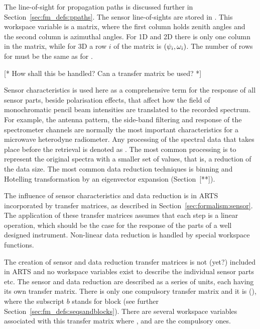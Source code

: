 The line-of-sight for propagation paths is discussed further in
Section~\ref{sec:fm_defs:ppaths}. The sensor line-of-sights are stored in
. This workspace variable is a matrix, where the
first column holds zenith angles and the second column is azimuthal
angles. For 1D and 2D there is only one column in the matrix, while
for 3D a row $i$ of the matrix is $(\psi_{i},\omega_{i})$. The
number of rows for  must be the same as for
.


\label{sec:fm_defs:sensorpol}

[* How shall this be handled? Can a transfer matrix be used?
 *]


\label{sec:fm_defs:sensorchar}

Sensor characteristics is used here as a
comprehensive term for the response of all sensor parts, beside
polarisation effects, that affect how the field of monochromatic
pencil beam intensities are translated to the recorded spectrum. For
example, the antenna pattern, the side-band filtering and response of
the spectrometer channels are normally the most important
characteristics for a microwave heterodyne radiometer. Any processing
of the spectral data that takes place before the retrieval is denoted
as . The most common processing is to represent
the original spectra with a smaller set of values, that is, a
reduction of the data size. The most common data reduction techniques
is binning and Hotelling transformation by an eigenvector expansion
(Section~[**]).

The influence of sensor characteristics and data reduction is in ARTS
incorporated by transfer matrices, as
described in Section~\ref{sec:formalism:sensor}. The application of
these transfer matrices assumes that each step is a linear operation,
which should be the case for the response of the parts of a well
designed instrument. Non-linear data reduction is handled by special
workspace functions.

The creation of sensor and data reduction transfer matrices is not
(yet?) included in ARTS and no workspace variables exist to describe
the individual sensor parts etc. The sensor and data reduction are
described as a series of units, each having its own transfer matrix.
There is only one compulsory transfer matrix and it is 
(), where the subscript $b$ stands for block (see further
Section~\ref{sec:fm_defs:seqsandblocks}). There are several workspace
variables associated with this transfer matrix where
,  and
 are the compulsory ones.

